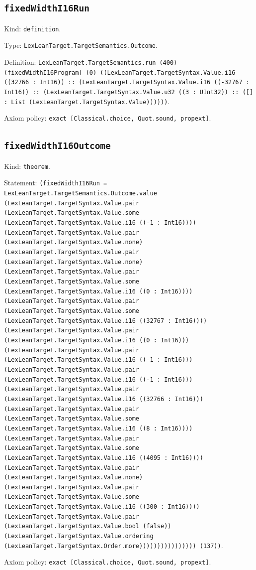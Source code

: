 \documentclass[11pt]{article}
\begin{document}
\subsection*{\texttt{fixedWidthI16Run}}
\noindent Kind: \texttt{definition}.\par
\noindent Type: \texttt{LexLeanTarget.TargetSemantics.Outcome}.\par
\noindent Definition: \texttt{LexLeanTarget.TargetSemantics.run (400) (fixedWidthI16Program) (0) ((LexLeanTarget.TargetSyntax.Value.i16 ((32766 : Int16)) :: (LexLeanTarget.TargetSyntax.Value.i16 ((-32767 : Int16)) :: (LexLeanTarget.TargetSyntax.Value.u32 ((3 : UInt32)) :: ([] : List (LexLeanTarget.TargetSyntax.Value))))))}.\par
\noindent Axiom policy: \texttt{exact [Classical.choice, Quot.sound, propext]}.\par
\subsection*{\texttt{fixedWidthI16Outcome}}
\noindent Kind: \texttt{theorem}.\par
\noindent Statement: \texttt{(fixedWidthI16Run = LexLeanTarget.TargetSemantics.Outcome.value (LexLeanTarget.TargetSyntax.Value.pair (LexLeanTarget.TargetSyntax.Value.some (LexLeanTarget.TargetSyntax.Value.i16 ((-1 : Int16)))) (LexLeanTarget.TargetSyntax.Value.pair (LexLeanTarget.TargetSyntax.Value.none) (LexLeanTarget.TargetSyntax.Value.pair (LexLeanTarget.TargetSyntax.Value.none) (LexLeanTarget.TargetSyntax.Value.pair (LexLeanTarget.TargetSyntax.Value.some (LexLeanTarget.TargetSyntax.Value.i16 ((0 : Int16)))) (LexLeanTarget.TargetSyntax.Value.pair (LexLeanTarget.TargetSyntax.Value.some (LexLeanTarget.TargetSyntax.Value.i16 ((32767 : Int16)))) (LexLeanTarget.TargetSyntax.Value.pair (LexLeanTarget.TargetSyntax.Value.i16 ((0 : Int16))) (LexLeanTarget.TargetSyntax.Value.pair (LexLeanTarget.TargetSyntax.Value.i16 ((-1 : Int16))) (LexLeanTarget.TargetSyntax.Value.pair (LexLeanTarget.TargetSyntax.Value.i16 ((-1 : Int16))) (LexLeanTarget.TargetSyntax.Value.pair (LexLeanTarget.TargetSyntax.Value.i16 ((32766 : Int16))) (LexLeanTarget.TargetSyntax.Value.pair (LexLeanTarget.TargetSyntax.Value.some (LexLeanTarget.TargetSyntax.Value.i16 ((8 : Int16)))) (LexLeanTarget.TargetSyntax.Value.pair (LexLeanTarget.TargetSyntax.Value.some (LexLeanTarget.TargetSyntax.Value.i16 ((4095 : Int16)))) (LexLeanTarget.TargetSyntax.Value.pair (LexLeanTarget.TargetSyntax.Value.none) (LexLeanTarget.TargetSyntax.Value.pair (LexLeanTarget.TargetSyntax.Value.some (LexLeanTarget.TargetSyntax.Value.i16 ((300 : Int16)))) (LexLeanTarget.TargetSyntax.Value.pair (LexLeanTarget.TargetSyntax.Value.bool (false)) (LexLeanTarget.TargetSyntax.Value.ordering (LexLeanTarget.TargetSyntax.Order.more)))))))))))))))) (137))}.\par
\noindent Axiom policy: \texttt{exact [Classical.choice, Quot.sound, propext]}.\par
\end{document}
